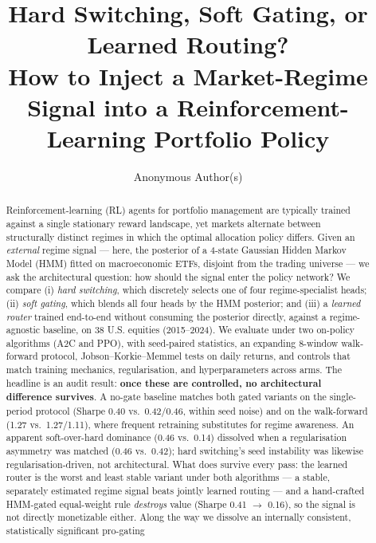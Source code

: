 \documentclass[sigconf,anonymous,review]{acmart}
\begin{document}
\title{Hard Switching, Soft Gating, or Learned Routing?\\
How to Inject a Market-Regime Signal into a Reinforcement-Learning Portfolio Policy}

\author{Anonymous Author(s)}

\begin{abstract}
Reinforcement-learning (RL) agents for portfolio management are typically
trained against a single stationary reward landscape, yet markets alternate
between structurally distinct regimes in which the optimal allocation policy
differs. Given an \emph{external} regime signal --- here, the posterior of a
4-state Gaussian Hidden Markov Model (HMM) fitted on macroeconomic ETFs,
disjoint from the trading universe --- we ask the architectural question:
how should the signal enter the policy network? We compare (i) \emph{hard
switching}, which discretely selects one of four regime-specialist heads;
(ii) \emph{soft gating}, which blends all four heads by the HMM posterior;
and (iii) a \emph{learned router} trained end-to-end without consuming the
posterior directly, against a regime-agnostic baseline, on 38 U.S. equities
(2015--2024). We evaluate under two on-policy algorithms (A2C and PPO), with
seed-paired statistics, an expanding 8-window walk-forward protocol,
Jobson--Korkie--Memmel tests on daily returns, and controls that match
training mechanics, regularisation, and hyperparameters across arms. The
headline is an audit result: \textbf{once these are controlled, no
architectural difference survives}. A no-gate baseline matches both gated
variants on the single-period protocol (Sharpe 0.40 vs.\ 0.42/0.46,
within seed noise) and on the walk-forward (1.27 vs.\ 1.27/1.11), where
frequent retraining substitutes for regime awareness. An apparent
soft-over-hard dominance (0.46 vs.\ 0.14) dissolved when a regularisation
asymmetry was matched (0.46 vs.\ 0.42); hard switching's seed instability
was likewise regularisation-driven, not architectural. What does survive
every pass: the learned router is the worst and least stable variant
under both algorithms --- a stable, separately estimated regime signal
beats jointly learned routing --- and a hand-crafted HMM-gated
equal-weight rule \emph{destroys} value (Sharpe 0.41 $\rightarrow$ 0.16),
so the signal is not directly monetizable either. Along the way we
dissolve an internally consistent, statistically significant pro-gating

\end{abstract}
\end{document}
